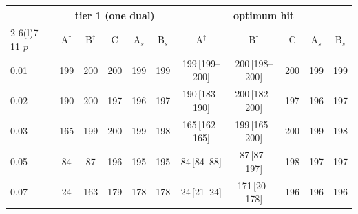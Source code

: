 \begin{tabular}{@{}lcccccccccc@{}}
\toprule
 & \multicolumn{5}{c}{tier 1 (one dual)} & \multicolumn{5}{c}{optimum hit} \\
\cmidrule(lr){2-6}\cmidrule(l){7-11}
$p$ & A$^\dagger$ & B$^\dagger$ & C & A$_s$ & B$_s$ & A$^\dagger$ & B$^\dagger$ & C & A$_s$ & B$_s$ \\
\midrule
0.01 & 199 & 200 & 200 & 199 & 199 & 199\,[199--200] & 200\,[198--200] & 200 & 199 & 199 \\
0.02 & 190 & 200 & 197 & 196 & 197 & 190\,[183--190] & 200\,[182--200] & 197 & 196 & 197 \\
0.03 & 165 & 199 & 200 & 199 & 198 & 165\,[162--165] & 199\,[165--200] & 200 & 199 & 198 \\
0.05 & 84 & 87 & 196 & 195 & 195 & 84\,[84--88] & 87\,[87--197] & 198 & 197 & 197 \\
0.07 & 24 & 163 & 179 & 178 & 178 & 24\,[21--24] & 171\,[20--178] & 196 & 196 & 196 \\
\bottomrule
\end{tabular}
